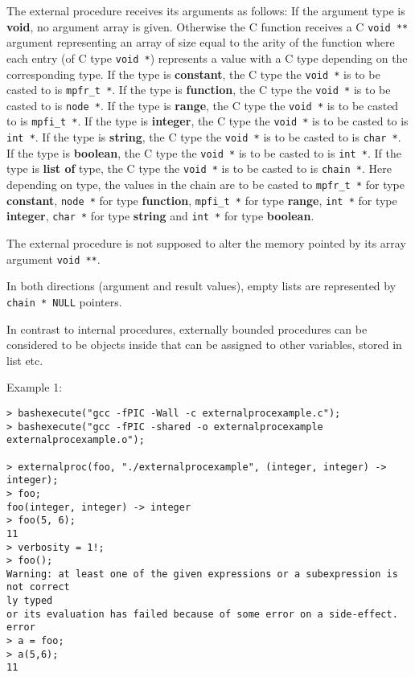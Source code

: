 \begin{itemize}
   The external procedure receives its arguments as follows: If the
   \sollya argument type is \textbf{void}, no argument array is given.  Otherwise
   the C function receives a C \texttt{void **} argument representing an array of
   size equal to the arity of the function where each entry (of C type
   \texttt{void *}) represents a value with a C type depending on the
   corresponding \sollya type. If the \sollya type is \textbf{constant}, the C
   type the \texttt{void *} is to be casted to is \texttt{mpfr\_t *}.  If the \sollya type
   is \textbf{function}, the C type the \texttt{void *} is to be casted to is \texttt{node *}.  If
   the \sollya type is \textbf{range}, the C type the \texttt{void *} is to be casted to is
   \texttt{mpfi\_t *}.  If the \sollya type is \textbf{integer}, the C type the \texttt{void *} is to
   be casted to is \texttt{int *}.  If the \sollya type is \textbf{string}, the C type the
   \texttt{void *} is to be casted to is \texttt{char *}.  If the \sollya type is \textbf{boolean},
   the C type the \texttt{void *} is to be casted to is \texttt{int *}.  If the \sollya
   type is \textbf{list of} type, the C type the \texttt{void *} is to be casted to is
   \texttt{chain *}.  Here depending on type, the values in the chain are to be
   casted to \texttt{mpfr\_t *}  for \sollya type \textbf{constant}, \texttt{node *} for \sollya type
   \textbf{function}, \texttt{mpfi\_t *} for \sollya type \textbf{range}, \texttt{int *} for \sollya type
   \textbf{integer}, \texttt{char *} for \sollya type \textbf{string} and \texttt{int *} for \sollya type
   \textbf{boolean}.
    
   The external procedure is not supposed to alter the memory pointed by
   its array argument \texttt{void **}.
    
   In both directions (argument and result values), empty lists are
   represented by \texttt{chain * NULL} pointers.
    
   In contrast to internal procedures, externally bounded procedures can
   be considered to be objects inside \sollya that can be assigned to other
   variables, stored in list etc.
\end{itemize}
\noindent Example 1: 
\begin{center}\begin{minipage}{15cm}\begin{Verbatim}[frame=single]
> bashexecute("gcc -fPIC -Wall -c externalprocexample.c");
> bashexecute("gcc -fPIC -shared -o externalprocexample externalprocexample.o");

> externalproc(foo, "./externalprocexample", (integer, integer) -> integer);
> foo;
foo(integer, integer) -> integer
> foo(5, 6);
11
> verbosity = 1!;
> foo();
Warning: at least one of the given expressions or a subexpression is not correct
ly typed
or its evaluation has failed because of some error on a side-effect.
error
> a = foo;
> a(5,6);
11
\end{Verbatim}
\end{minipage}\end{center}
